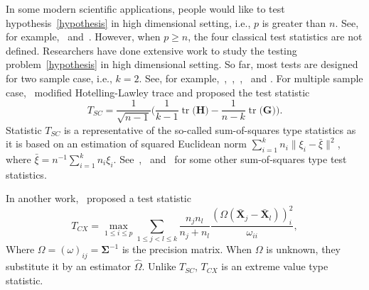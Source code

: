 \documentclass[12pt]{article} %
\DeclareMathOperator{\mytr}{tr}
\newcommand{\bX}{\mathbf{X}}
\newcommand{\bH}{\mathbf{H}}
\newcommand{\bG}{\mathbf{G}}
\newcommand{\bfsym}[1]{\ensuremath{\boldsymbol{#1}}}
\def\bSigma {\bfsym {\Sigma}}
\theoremstyle{definition}
\begin{document}
In some modern scientific applications, people would like to test hypothesis~\eqref{hypothesis} in high dimensional setting, i.e., $p$ is greater than $n$.
See, for example,~\citet{Verstynen1209} and~\citet{Tsai2009}.
However, when $p\geq n$, the four classical test statistics are not defined.
  Researchers have done extensive work to study the testing problem~\eqref{hypothesis} in high dimensional setting.
 So far, most tests are designed for two sample case, i.e., $k=2$.
  See, for example,~\citet{Bai1996Efiect},~\cite{Srivastava2007Multivariate},~\citet{Chen2010A},~\citet{Tony2013} and \citet{Feng2014Two}.
  For multiple sample case,~\cite{Schott2007Some} modified Hotelling-Lawley trace and proposed the test statistic
  $$
  T_{SC}=\frac{1}{\sqrt{n-1}}\Big(
  \frac{1}{k-1}\mytr\big(\bH\big)-\frac{1}{n-k}\mytr\big(\bG\big)
  \Big).
  $$
Statistic $T_{SC}$ is a representative of the so-called sum-of-squares type statistics as it is based on an estimation of squared Euclidean norm $\sum_{i=1}^k n_i\|\xi_i-\bar{\xi}\|^2$, where $\bar{\xi}=n^{-1}\sum_{i=1}^k n_i \xi_i$.
See~\cite{Srivastava2013},~\cite{Yamada2015} and~\cite{Chang2017} for some other sum-of-squares type test statistics.

In another work,~\cite{Cai2014High} proposed a test statistic 
  $$
  T_{CX}=\max_{1\leq i\leq p} \sum_{1\leq j<l\leq k}\frac{n_j n_l}{n_j+n_l}\frac{(\Omega(\bar{\bX}_j-\bar{\bX}_l))_i^2}{\omega_{ii}},
  $$
  Where $\Omega=(\omega)_{ij}=\bSigma^{-1}$ is the precision matrix. When $\Omega$ is unknown, they substitute it by an estimator $\hat{\Omega}$.
  Unlike $T_{SC}$, $T_{CX}$ is an extreme value type statistic.
  
\end{document}
